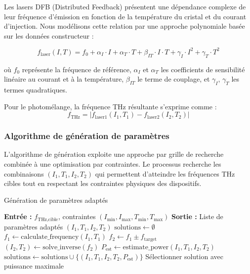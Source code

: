 Les lasers DFB (Distributed Feedback) présentent une dépendance complexe de leur fréquence d'émission en fonction de la température du cristal et du courant d'injection. Nous modélisons cette relation par une approche polynomiale basée sur les données constructeur :

\begin{equation}
f_{\text{laser}}(I, T) = f_0 + \alpha_I \cdot I + \alpha_T \cdot T + \beta_{IT} \cdot I \cdot T + \gamma_I \cdot I^2 + \gamma_T \cdot T^2
\end{equation}

où $f_0$ représente la fréquence de référence, $\alpha_I$ et $\alpha_T$ les coefficients de sensibilité linéaire au courant et à la température, $\beta_{IT}$ le terme de couplage, et $\gamma_I$, $\gamma_T$ les termes quadratiques.

Pour le photomélange, la fréquence THz résultante s'exprime comme :
\begin{equation}
f_{\text{THz}} = |f_{\text{laser1}}(I_1, T_1) - f_{\text{laser2}}(I_2, T_2)|
\end{equation}

\subsubsection{Algorithme de génération de paramètres}

L'algorithme de génération exploite une approche par grille de recherche combinée à une optimisation par contraintes. Le processus recherche les combinaisons $(I_1, T_1, I_2, T_2)$ qui permettent d'atteindre les fréquences THz cibles tout en respectant les contraintes physiques des dispositifs.

\begin{algorithm}[ht]
\caption{Génération de paramètres adaptés}
\begin{algorithmic}[1]
\State \textbf{Entrée :} $f_{\text{THz,cible}}$, contraintes $(I_{\min}, I_{\max}, T_{\min}, T_{\max})$
\State \textbf{Sortie :} Liste de paramètres adaptés $(I_1, T_1, I_2, T_2)$
    \State $\text{solutions} \leftarrow \emptyset$
            \State $f_1 \leftarrow \text{calculate\_frequency}(I_1, T_1)$
            \State $f_2 \leftarrow f_1 \pm f_{\text{target}}$
            \State $(I_2, T_2) \leftarrow \text{solve\_inverse}(f_2)$
                \State $P_{\text{est}} \leftarrow \text{estimate\_power}(I_1, T_1, I_2, T_2)$
                \State $\text{solutions} \leftarrow \text{solutions} \cup \{(I_1, T_1, I_2, T_2, P_{\text{est}})\}$
            \EndIf
        \EndFor
    \EndFor
    \State Sélectionner solution avec puissance maximale
\EndFor
\end{algorithmic}
\end{algorithm}

